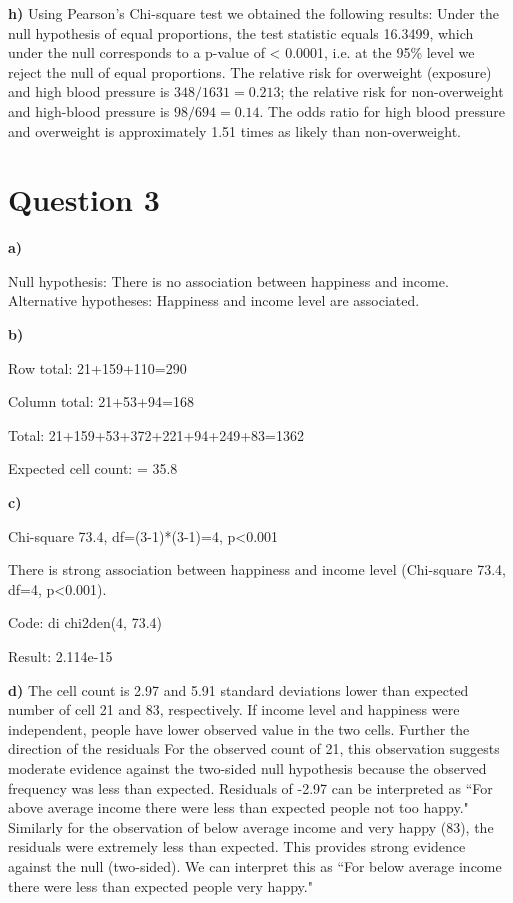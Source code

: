 \documentclass{article}
\begin{document}
\textbf{h)} Using Pearson's Chi-square test we obtained the following results:
Under the null hypothesis of equal proportions, the test statistic equals
16.3499, which under the null corresponds to a p-value of < 0.0001, i.e. at the
95\% level we reject the null of equal proportions. The relative risk for overweight (exposure) and high blood pressure is $348/1631=0.213$; the relative risk for non-overweight and high-blood pressure is $98/694=0.14$. The odds ratio for high blood pressure and overweight is approximately 1.51 times as likely than non-overweight. 

\section*{Question 3}

\textbf{a)}

Null hypothesis: There is no association between happiness and income.
Alternative hypotheses: Happiness and income level are associated.

\textbf{b)}

Row total: 21+159+110=290 \par
Column total: 21+53+94=168 \par
Total: 21+159+53+372+221+94+249+83=1362 \par
Expected cell count:  = 35.8

\textbf{c)}

Chi-square 73.4, df=(3-1)*(3-1)=4, p<0.001 \par

There is strong association between happiness and income level (Chi-square 73.4, df=4, p<0.001). \par

Code: di chi2den(4, 73.4) \par
Result: 2.114e-15

\textbf{d)}
The cell count is 2.97 and 5.91 standard deviations lower than expected number of cell 21 and 83, respectively.
If income level and happiness were independent, people have lower observed value in the two cells. Further the direction of the residuals  For the observed count of 21, this observation suggests moderate evidence against the two-sided null hypothesis because the observed frequency was less than expected. Residuals of -2.97 can be interpreted as ``For above average income there were less than expected people not too happy."  Similarly for the observation of below average income and very happy (83), the residuals were extremely less than expected. This provides strong evidence against the null (two-sided). We can interpret this as ``For below average income there were less than expected people very happy."  
\end{document}
